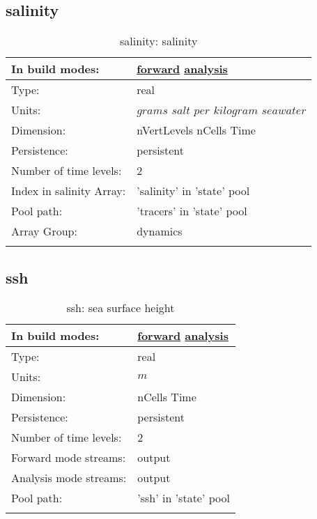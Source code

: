 \subsection[salinity]{salinity}
\label{subsec:var_sec_state_salinity}
\begin{center}
\begin{longtable}{| p{2.0in} | p{4.0in} |}
        \hline 
        In build modes: & \hyperref[subsec:forward_var_tab_state]{forward} \hyperref[subsec:analysis_var_tab_state]{analysis} \\
        \hline 
        Type: & real \\
        \hline 
        Units: & $grams$ $salt$ $per$ $kilogram$ $seawater$ \\
        \hline 
        Dimension: & nVertLevels nCells Time \\
        \hline 
        Persistence: & persistent \\
        \hline 
        Number of time levels: & 2 \\
        \hline 
		 Index in salinity Array: & 'salinity' in 'state' pool \\
		 \hline 
            Pool path: & 'tracers' in 'state' pool
 \\
		 \hline 
		 Array Group: & dynamics \\
		 \hline 
    \caption{salinity: salinity}
\end{longtable}
\end{center}
\subsection[ssh]{ssh}
\label{subsec:var_sec_state_ssh}
\begin{center}
\begin{longtable}{| p{2.0in} | p{4.0in} |}
        \hline 
        In build modes: & \hyperref[subsec:forward_var_tab_state]{forward} \hyperref[subsec:analysis_var_tab_state]{analysis} \\
        \hline 
        Type: & real \\
        \hline 
        Units: & $m$ \\
        \hline 
        Dimension: & nCells Time \\
        \hline 
        Persistence: & persistent \\
        \hline 
        Number of time levels: & 2 \\
        \hline 
		 Forward mode streams: &  output \\
        \hline 
		 Analysis mode streams: &  output \\
        \hline 
            Pool path: & 'ssh' in 'state' pool
 \\
		 \hline 
    \caption{ssh: sea surface height}
\end{longtable}
\end{center}
